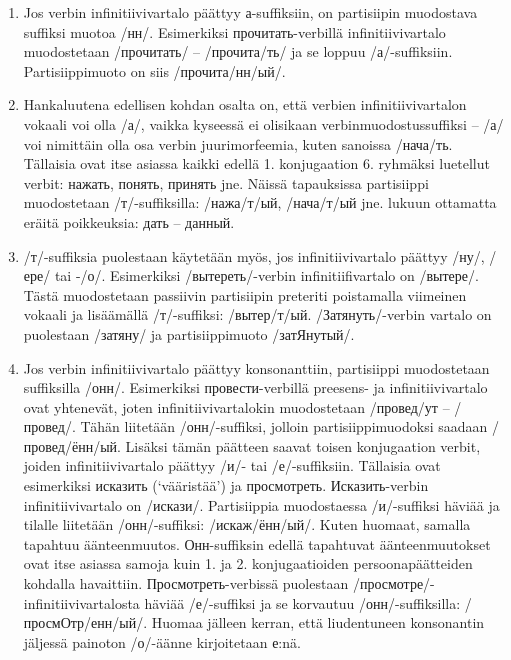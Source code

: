 \documentclass[]{scrartcl}
\providecommand{\tightlist}{%
  \setlength{\itemsep}{0pt}\setlength{\parskip}{0pt}}
\begin{document}
\begin{enumerate}
\def\labelenumi{\arabic{enumi}.}
\tightlist
\item
  Jos verbin infinitiivivartalo päättyy а-suffiksiin, on partisiipin
  muodostava suffiksi muotoa /нн/. Esimerkiksi прочитать-verbillä
  infinitiivivartalo muodostetaan /прочитать/ -- /прочита/ть/ ja se
  loppuu /а/-suffiksiin. Partisiippimuoto on siis /прочита/нн/ый/.
\item
  Hankaluutena edellisen kohdan osalta on, että verbien
  infinitiivivartalon vokaali voi olla /а/, vaikka kyseessä ei olisikaan
  verbinmuodostussuffiksi -- /а/ voi nimittäin olla osa verbin
  juurimorfeemia, kuten sanoissa /нача/ть. Tällaisia ovat itse asiassa
  kaikki edellä 1. konjugaation 6. ryhmäksi luetellut verbit: нажать,
  понять, принять jne. Näissä tapauksissa partisiippi muodostetaan
  /т/-suffiksilla: /нажа/т/ый, /нача/т/ый jne. lukuun ottamatta eräitä
  poikkeuksia: дать -- данный.
\item
  /т/-suffiksia puolestaan käytetään myös, jos infinitiivivartalo
  päättyy /ну/, /ере/ tai -/о/. Esimerkiksi /вытереть/-verbin
  infinitiifivartalo on /вытере/. Tästä muodostetaan passiivin
  partisiipin preteriti poistamalla viimeinen vokaali ja lisäämällä
  /т/-suffiksi: /вытер/т/ый. /Затянуть/-verbin vartalo on puolestaan
  /затяну/ ja partisiippimuoto /затЯнутый/.
\item
  Jos verbin infinitiivivartalo päättyy konsonanttiin, partisiippi
  muodostetaan suffiksilla /онн/. Esimerkiksi провести-verbillä
  preesens- ja infinitiivivartalo ovat yhtenevät, joten
  infinitiivivartalokin muodostetaan /провед/ут -- /провед/. Tähän
  liitetään /онн/-suffiksi, jolloin partisiippimuodoksi saadaan
  /провед/ённ/ый. Lisäksi tämän päätteen saavat toisen konjugaation
  verbit, joiden infinitiivivartalo päättyy /и/- tai /е/-suffiksiin.
  Tällaisia ovat esimerkiksi исказить (`vääristää') ja просмотреть.
  Исказить-verbin infinitiivivartalo on /искази/. Partisiippia
  muodostaessa /и/-suffiksi häviää ja tilalle liitetään /онн/-suffiksi:
  /искаж/ённ/ый/. Kuten huomaat, samalla tapahtuu äänteenmuutos.
  Онн-suffiksin edellä tapahtuvat äänteenmuutokset ovat itse asiassa
  samoja kuin 1. ja 2. konjugaatioiden persoonapäätteiden kohdalla
  havaittiin. Просмотреть-verbissä puolestaan
  /просмотре/-infinitiivivartalosta häviää /е/-suffiksi ja se korvautuu
  /онн/-suffiksilla: /просмОтр/енн/ый/. Huomaa jälleen kerran, että
  liudentuneen konsonantin jäljessä painoton /о/-äänne kirjoitetaan
  е:nä.
\end{enumerate}
\end{document}
